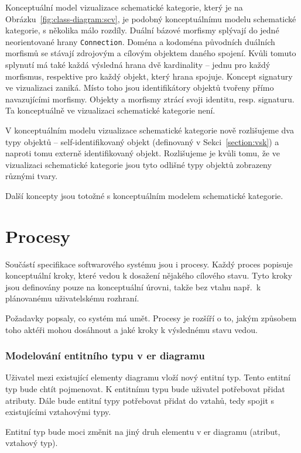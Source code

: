 Konceptuální model vizualizace schematické kategorie, který je na Obrázku~\ref{fig:class-diagram:scv}, je podobný konceptuálnímu modelu schematické kategorie, s několika málo rozdíly.
Duální bázové morfismy splývají do jedné neorientované hrany \texttt{Connection}.
Doména a kodoména původních duálních morfismů se stávají zdrojovým a cílovým objektem daného spojení.
Kvůli tomuto splynutí má také každá výsledná hrana dvě kardinality -- jednu pro každý morfismus, respektive pro každý objekt, který hrana spojuje.
Koncept signatury ve vizualizaci zaniká.
Místo toho jsou identifikátory objektů tvořeny přímo navazujícími morfismy.
Objekty a morfismy ztrácí svoji identitu, resp. signaturu.
Ta konceptuálně ve vizualizaci schematické kategorie není.

V konceptuálním modelu vizualizace schematické kategorie nově rozlišujeme dva typy objektů -- self-identifikovaný objekt (definovaný v Sekci~\ref{section:vsk}) a naproti tomu externě identifikovaný objekt.
Rozlišujeme je kvůli tomu, že ve vizualizaci schematické kategorie jsou tyto odlišné typy objektů zobrazeny různými tvary.

Další koncepty jsou totožné s konceptuálním modelem schematické kategorie.

\section{Procesy}

Součástí specifikace softwarového systému jsou i procesy.
Každý proces popisuje konceptuální kroky, které vedou k dosažení nějakého cílového stavu.
Tyto kroky jsou definovány pouze na konceptuální úrovni, takže bez vtahu např.~k plánovanému uživatelskému rozhraní.

Požadavky popsaly, co systém má umět.
Procesy je rozšíří o to, jakým způsobem toho aktéři mohou dosáhnout a jaké kroky k výslednému stavu vedou.

\subsubsection*{Modelování entitního typu v \acrshort{er} diagramu}

Uživatel mezi existující elementy diagramu vloží nový entitní typ.
Tento entitní typ bude chtít pojmenovat.
K entitnímu typu bude uživatel potřebovat přidat atributy.
Dále bude entitní typy potřebovat přidat do vztahů, tedy spojit s existujícími vztahovými typy.

Entitní typ bude moci změnit na jiný druh elementu v \acrshort{er} diagramu (atribut, vztahový typ).

